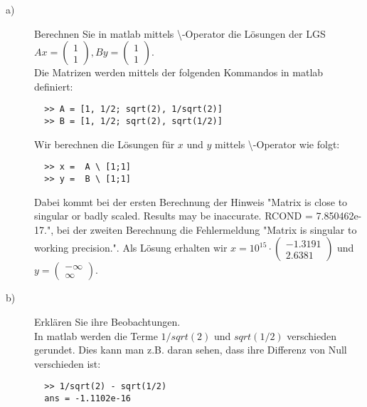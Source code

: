 \documentclass[11pt,a4paper,ngerman]{article}
\begin{document}
\begin{description}

\item[a)] Berechnen Sie in matlab mittels \textbackslash -Operator die Lösungen der LGS \\
          $Ax = \left( \begin{array}{c} 1 \\ 1\end{array}\right), 
           By = \left( \begin{array}{c} 1 \\ 1\end{array}\right)$. \\
            
          Die Matrizen werden mittels der folgenden Kommandos in matlab definiert:          
          \begin{lstlisting}
  >> A = [1, 1/2; sqrt(2), 1/sqrt(2)]
  >> B = [1, 1/2; sqrt(2), sqrt(1/2)]
          \end{lstlisting}
          
          Wir berechnen die Lösungen für $x$ und $y$ mittels \textbackslash -Operator wie folgt:

          \begin{lstlisting}
  >> x =  A \ [1;1]
  >> y =  B \ [1;1]
          \end{lstlisting}

          Dabei kommt bei der ersten Berechnung der Hinweis "Matrix is close to singular or badly scaled. Results may be inaccurate. RCOND = 7.850462e-17.", bei der zweiten Berechnung die Fehlermeldung "Matrix is singular to working precision.".
          Als Lösung erhalten wir
          $x = 10^{15} \cdot \left( \begin{array}{c} -1.3191 \\ 2.6381 \end{array} \right)$ und
          $y = \left( \begin{array}{c} -\infty \\ \infty \end{array} \right)$.

\item[b)] Erklären Sie ihre Beobachtungen. \\

          In matlab werden die Terme $1/sqrt(2)$ und $sqrt(1/2)$ verschieden gerundet.
          Dies kann man z.B. daran sehen, dass ihre Differenz von Null verschieden ist:

          \begin{lstlisting}          
  >> 1/sqrt(2) - sqrt(1/2)
  ans = -1.1102e-16
          \end{lstlisting}
          

\end{description}
\end{document}
